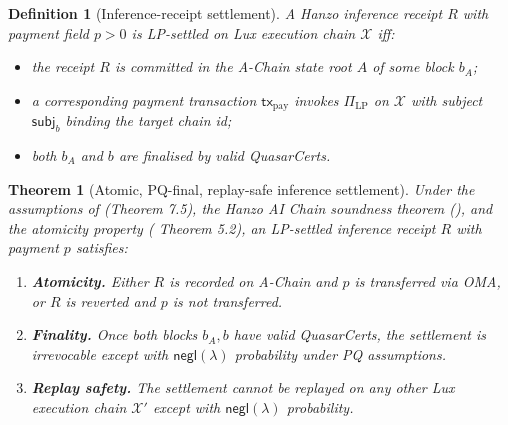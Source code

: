 \documentclass[11pt]{article}
\newtheorem{theorem}{Theorem}
\newtheorem{definition}{Definition}
\begin{document}
\begin{definition}[Inference-receipt settlement]
\label{def:settle}
A Hanzo inference receipt $R$ with payment field $p > 0$ is
\emph{LP-settled} on Lux execution chain $\mathcal{X}$ iff:
\begin{itemize}[nosep]
  \item the receipt $R$ is committed in the A-Chain state root $A$
        of some block $b_A$;
  \item a corresponding payment transaction
        $\mathsf{tx}_{\mathrm{pay}}$ invokes $\Pi_{\mathrm{LP}}$ on
        $\mathcal{X}$ with subject $\mathsf{subj}_b$ binding the
        target chain id;
  \item both $b_A$ and $b$ are finalised by valid QuasarCerts.
\end{itemize}
\end{definition}

\begin{theorem}[Atomic, PQ-final, replay-safe inference settlement]
\label{thm:hanzo-settle}
Under the assumptions of \cite{quasar-cert} (Theorem 7.5), the Hanzo
AI Chain soundness theorem (\cite{hanzo-soundness}), and the
 atomicity property (\cite{lp-paper} Theorem 5.2),
an LP-settled inference receipt $R$ with payment $p$ satisfies:
\begin{enumerate}[nosep]
  \item \textbf{Atomicity.} Either $R$ is recorded on A-Chain
        \emph{and} $p$ is transferred via OMA, or $R$ is reverted and
        $p$ is not transferred.
  \item \textbf{Finality.} Once both blocks $b_A, b$ have valid
        QuasarCerts, the settlement is irrevocable except with
        $\mathsf{negl}(\lambda)$ probability under PQ assumptions.
  \item \textbf{Replay safety.} The settlement cannot be replayed on
        any other Lux execution chain $\mathcal{X}'$ except with
        $\mathsf{negl}(\lambda)$ probability.
\end{enumerate}
\end{theorem}
\end{document}
